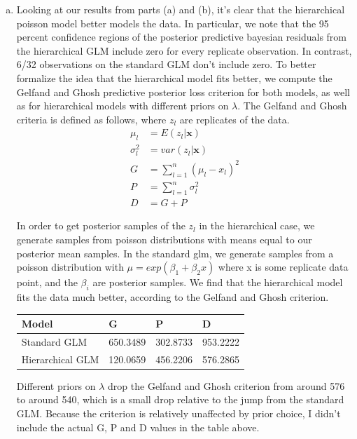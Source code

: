 \documentclass[12pt]{article}
\begin{document}
\begin{enumerate}[(a)]
\begin{enumerate}[(i)]
	 
	 
\end{enumerate}

\item Looking at our results from parts (a) and (b), it's clear that the hierarchical poisson model better models the data. In particular, we note that the 95 percent confidence regions of the posterior predictive bayesian residuals from the hierarchical GLM include zero for every replicate observation. In contrast, 6/32 observations on the standard GLM don't include zero. To better formalize the idea that the hierarchical model fits better, we compute the Gelfand and Ghosh predictive posterior loss criterion for both models, as well as for hierarchical models with different priors on $\lambda$. The Gelfand and Ghosh criteria is defined as follows, where $z_l$ are replicates of the data. 
\begin{align*}
\mu_l &= E(z_l|\textbf{x})\\
\sigma^2_l &= var(z_l|\textbf{x}) \\
G &= \sum_{l = 1}^{n} (\mu_l - x_l)^2  \\
P &= \sum_{l = 1}^{n} \sigma^2_l \\
D &= G + P 
\end{align*}


In order to get posterior samples of the $z_l$ in the hierarchical case, we generate samples from poisson distributions with means equal to our posterior mean samples. In the standard glm, we generate samples from a poisson distribution with $\mu = exp(\beta_1 + \beta_2 x)$ where x is some replicate data point, and the $\beta_i$ are posterior samples. We find that the hierarchical model fits the data much better, according to the Gelfand and Ghosh criterion. 


\begin{table}[]
	\centering
	\begin{tabular}{|l|l|l|l|}
		\hline
		Model            & G        & P        & D        \\ \hline
		Standard GLM     & 650.3489 & 302.8733 & 953.2222 \\ \hline
		Hierarchical GLM & 120.0659 & 456.2206 & 576.2865 \\ \hline
	\end{tabular}
\end{table}


Different priors on $\lambda$ drop the Gelfand and Ghosh criterion from around 576 to around 540, which is a small drop relative to the jump from the standard GLM. Because the criterion is relatively unaffected by prior choice, I didn't include the actual G, P and D values in the table above. 






	
\end{enumerate}
\end{document}
